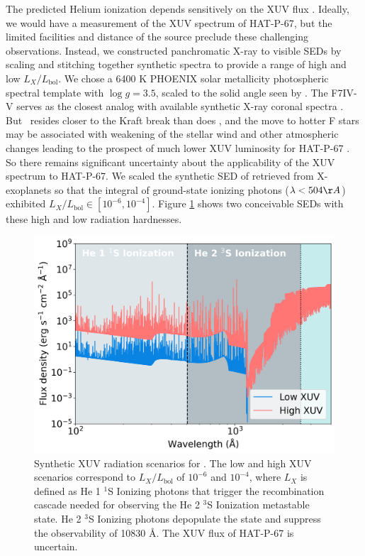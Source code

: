 \documentclass[twocolumn]{aastex631}
\newcommand{\hatp}{\object{HAT-P-67}~}
\newcommand{\hatpb}{\object{HAT-P-67 b}}
\begin{document}
The predicted Helium ionization depends sensitively on the XUV flux \citep{2019ApJ...881..133O}.  Ideally, we would have a measurement of the XUV spectrum of HAT-P-67, but the limited facilities and distance of the source preclude these challenging observations.  Instead, we constructed panchromatic X-ray to visible SEDs by scaling and stitching together synthetic spectra to provide a range of high and low $L_X/L_\mathrm{bol}$.  We chose a 6400 K PHOENIX \citep{husser13} solar metallicity photospheric spectral template with $\log{g}=3.5$, scaled to the solid angle seen by \hatpb.  The F7IV-V  serves as the closest analog with available synthetic X-ray coronal spectra \citep{2011A&A...532A...6S}.  But \hatp resides closer to the Kraft break than does , and the move to hotter F stars may be associated with weakening of the stellar wind and other atmospheric changes leading to the prospect of much lower XUV luminosity for HAT-P-67 \citep{2022ApJ...930....7A}.  So there remains significant uncertainty about the applicability of the  XUV spectrum to HAT-P-67.  We scaled the synthetic SED of  retrieved from X-exoplanets \citep{2011A&A...532A...6S} so that the integral of ground-state ionizing photons ($\lambda<504\AA$) exhibited $L_X/L_\mathrm{bol} \in [10^{-6}, 10^{-4}]$.  Figure \ref{fig:XUV} shows two conceivable SEDs with these high and low radiation hardnesses.

\begin{figure}
    \includegraphics[width=\linewidth]{figures/XUV_flux_schematic.png}
    \caption{Synthetic XUV radiation scenarios for \hatpb.  The low and high XUV scenarios correspond to $L_X/L_\mathrm{bol}$ of $10^{-6}$ and $10^{-4}$, where $L_X$ is defined as He 1 $^1$S Ionizing photons that trigger the recombination cascade needed for observing the He 2 $^3$S Ionization metastable state.  He 2 $^3$S Ionizing photons depopulate the state and suppress the observability of  10830 \AA.  The XUV flux of HAT-P-67 is uncertain.}
    \label{fig:XUV}
\end{figure}
\end{document}

